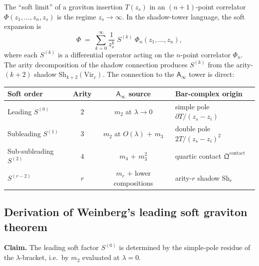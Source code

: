 \documentclass[11pt]{article}
\newcommand{\Ainf}{\mathsf{A}_{\infty}}
\begin{document}
The ``soft limit'' of a graviton insertion $T(z_s)$ in an
$(n+1)$-point correlator $\Phi(z_1, \ldots, z_n, z_s)$ is
the regime $z_s \to \infty$.  In the shadow-tower language,
the soft expansion is
\begin{equation}\label{eq:soft-expansion-master}
\Phi
\;=\;
\sum_{k=0}^{\infty}
\frac{1}{z_s^k}\;S^{(k)}\;\Phi_n(z_1, \ldots, z_n),
\end{equation}
where each $S^{(k)}$ is a differential operator acting on
the $n$-point correlator $\Phi_n$.  The arity decomposition
of the shadow connection produces $S^{(k)}$ from the
arity-$(k+2)$ shadow $\mathrm{Sh}_{k+2}(\mathrm{Vir}_c)$.
The connection to the $\Ainf$ tower is direct:
\begin{center}
\renewcommand{\arraystretch}{1.15}
\begin{tabular}{lccl}
\hline
\textbf{Soft order} & \textbf{Arity} & \textbf{$\Ainf$ source}
  & \textbf{Bar-complex origin} \\
\hline
Leading $S^{(0)}$ & $2$ & $m_2$ at $\lambda \to 0$
  & simple pole $\partial T / (z_s - z_i)$ \\
Subleading $S^{(1)}$ & $3$ & $m_2$ at $O(\lambda)$ $+$ $m_3$
  & double pole $2T / (z_s - z_i)^2$ \\
Sub-subleading $S^{(2)}$ & $4$ & $m_4$ $+$ $m_3^2$
  & quartic contact $\mathfrak{Q}^{\mathrm{contact}}$ \\
$S^{(r-2)}$ & $r$ & $m_r$ $+$ lower compositions
  & arity-$r$ shadow $\mathrm{Sh}_r$ \\
\hline
\end{tabular}
\end{center}

\subsection{Derivation of Weinberg's leading soft graviton theorem}

\noindent\textbf{Claim.} The leading soft factor $S^{(0)}$
is determined by the simple-pole residue of the $\lambda$-bracket,
i.e.\ by $m_2$ evaluated at $\lambda = 0$.
\end{document}
